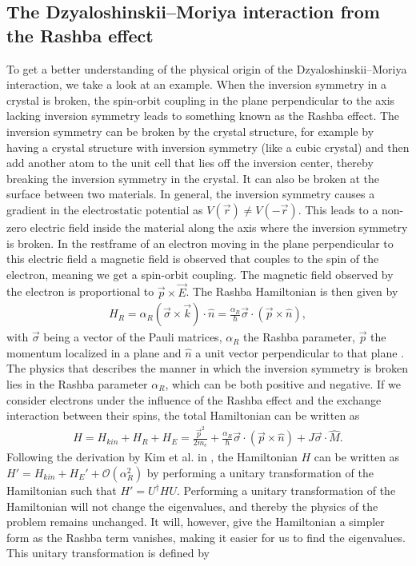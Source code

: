 \documentclass[12pt, a4paper, twoside, openright]{article}		%
\DeclareRobustCommand{\orderof}{\ensuremath{\mathcal{O}}}
\numberwithin{equation}{section}
\begin{document}
\subsection{The Dzyaloshinskii--Moriya interaction from the Rashba effect}
To get a better understanding of the physical origin of the Dzyaloshinskii--Moriya interaction, we take a look at an example. When the inversion symmetry in a crystal is broken, the spin-orbit coupling in the plane perpendicular to the axis lacking inversion symmetry leads to something known as the Rashba effect. The inversion symmetry can be broken by the crystal structure, for example by having a crystal structure with inversion symmetry (like a cubic crystal) and then add another atom to the unit cell that lies off the inversion center, thereby breaking the inversion symmetry in the crystal. It can also be broken at the surface between two materials. In general, the inversion symmetry causes a gradient in the electrostatic potential as $V(\vec{r}) \neq V(-\vec{r})$. This leads to a non-zero electric field inside the material along the axis where the inversion symmetry is broken. In the restframe of an electron moving in the plane perpendicular to this electric field a magnetic field is observed that couples to the spin of the electron, meaning we get a spin-orbit coupling. The magnetic field observed by the electron is proportional to $\vec{p}\times\vec{E}$. The Rashba Hamiltonian is then given by
\begin{align}
\label{eq:RashbaH}
H_R = \alpha_R (\vec{\sigma} \times \vec{k})\cdot \hat{n} = \frac{\alpha_R}{\hbar} \vec{\sigma}\cdot(\vec{p}\times\hat{n}),
\end{align}
with $\vec{\sigma}$ being a vector of the Pauli matrices, $\alpha_R$ the Rashba parameter, $\vec{p}$ the momentum localized in a plane and $\hat{n}$ a unit vector perpendicular to that plane \cite{BychovRashba1984}. The physics that describes the manner in which the inversion symmetry is broken lies in the Rashba parameter $\alpha_R$, which can be both positive and negative. If we consider electrons under the influence of the Rashba effect and the exchange interaction between their spins, the total Hamiltonian can be written as
\begin{align}
\label{eq:RashbaModel}
H = H_{kin} + H_R + H_E = \frac{\vec{p}^2}{2m_e} + \frac{\alpha_R}{\hbar} \vec{\sigma}\cdot(\vec{p}\times\hat{n}) + J \vec{\sigma}\cdot\hat{M}.
\end{align}
Following the derivation by Kim et al. in \cite{DMIfromRashba_Kim}, the Hamiltonian $H$ can be written as $H'=H_{kin}+H_E'+\orderof(\alpha_R^2)$ by performing a unitary transformation of the Hamiltonian such that $H' = U^{\dagger}HU$. Performing a unitary transformation of the Hamiltonian will not change the eigenvalues, and thereby the physics of the problem remains unchanged. It will, however, give the Hamiltonian a simpler form as the Rashba term vanishes, making it easier for us to find the eigenvalues. This unitary transformation is defined by
\end{document}
